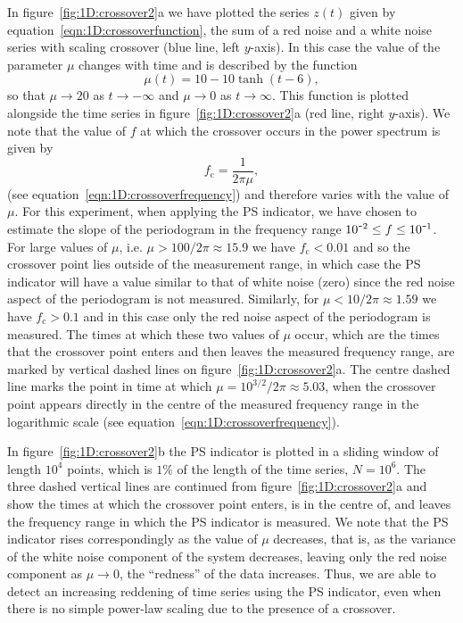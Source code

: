 {{{In figure~\ref{fig:1D:crossover2}a we have plotted the series $z(t)$ given by equation~\ref{eqn:1D:crossoverfunction}, the sum of a red noise and a white noise series with scaling crossover (blue line, left $y$-axis). In this case the value of the parameter $\mu$ changes with time and is described by the function
	\begin{equation}
		\mu(t) = 10-10\tanh(t-6),
	\end{equation}
so that $\mu\rightarrow20$ as $t\rightarrow-\infty$ and $\mu\rightarrow0$ as $t\rightarrow\infty$. This function is plotted alongside the time series in figure~\ref{fig:1D:crossover2}a (red line, right $y$-axis). We note that the value of $f$ at which the crossover occurs in the power spectrum is given by 
	\begin{equation}
		f_\text{c} = \frac{1}{2\pi\mu},
	\end{equation}
(see equation~\ref{eqn:1D:crossoverfrequency}) and therefore varies with the value of $\mu$. For this experiment, when applying the PS indicator, we have chosen to estimate the slope of the periodogram in the frequency range $10^{\textup{\texttt{-}}2}\leq f \leq 10^{\textup{\texttt{-}}1}$. For large values of $\mu$, i.e. $\mu>100/2\pi\approx15.9$ we have $f_\text{c}<0.01$ and so the crossover point lies outside of the measurement range, in which case the PS indicator will have a value similar to that of white noise (zero) since the red noise aspect of the periodogram is not measured. Similarly, for $\mu<10/2\pi\approx1.59$ we have $f_\text{c}>0.1$ and in this case only the red noise aspect of the periodogram is measured. The times at which these two values of $\mu$ occur, which are the times that the crossover point enters and then leaves the measured frequency range, are marked by vertical dashed lines on figure~\ref{fig:1D:crossover2}a. The centre dashed line marks the point in time at which $\mu = 10^{3/2}/2\pi\approx5.03$, when the crossover point appears directly in the centre of the measured frequency range in the logarithmic scale (see equation~\ref{eqn:1D:crossoverfrequency}). 

In figure~\ref{fig:1D:crossover2}b the PS indicator is plotted in a sliding window of length $10^4$ points, which is $1\%$ of the length of the time series, $N=10^6$. The three dashed vertical lines are continued from figure~\ref{fig:1D:crossover2}a and show the times at which the crossover point enters, is in the centre of, and leaves the frequency range in which the PS indicator is measured. We note that the PS indicator rises correspondingly as the value of $\mu$ decreases, that is, as the variance of the white noise component of the system decreases, leaving only the red noise component as $\mu\rightarrow0$, the ``redness'' of the data increases. Thus, we are able to detect an increasing reddening of time series using the PS indicator, even when there is no simple power-law scaling due to the presence of a crossover. 

}}}
